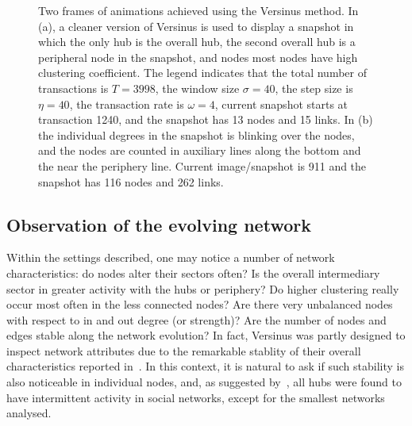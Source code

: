 \documentclass[runningheads]{llncs}
\begin{document}
\begin{figure}[!h]\centering
    \qquad
    \caption{Two frames of animations achieved using the Versinus method. In (a), a cleaner version of Versinus is used to display a snapshot in which the only hub is the overall hub, the second overall hub is a peripheral node in the snapshot, and nodes most nodes have high clustering coefficient. The legend indicates that the total number of transactions is $T=3998$, the window size $\sigma=40$, the step size is $\eta=40$, the transaction rate is $\omega=4$, current snapshot starts at transaction 1240, and the snapshot has 13 nodes and 15 links. In (b) the individual degrees in the snapshot is blinking over the nodes, and the nodes are counted in auxiliary lines along the bottom and the near the periphery line. Current image/snapshot is 911 and the snapshot has 116 nodes and 262 links.}%
    \label{fig:final}%
\end{figure}

\subsection{Observation of the evolving network}
Within the settings described, one may notice a number of network characteristics: do nodes alter their sectors often? Is the overall intermediary sector in greater activity with the hubs or periphery?
Do higher clustering really occur most often in the less connected nodes?
Are there very unbalanced nodes with respect to in and out degree (or strength)?
Are the number of nodes and edges stable along the network evolution?
In fact, Versinus was partly designed to inspect network attributes due to the remarkable stablity of their overall characteristics reported in~\cite{stab}.
In this context, it is natural to ask if such stability is also noticeable in individual nodes, and, 
as suggested by~\cite{barabasiEvo}, all hubs were found to have intermittent activity in social networks, except for the smallest networks analysed.
\end{document}
